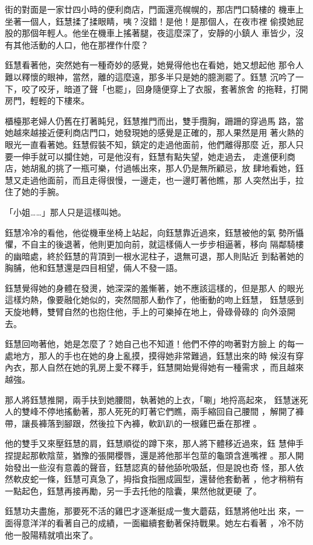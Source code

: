 街的對面是一家廿四小時的便利商店，門面還亮幌幌的，那店門口騎樓的
機車上坐著一個人，鈺慧揉了揉眼睛，咦？沒錯！是他！是那個人，在夜市裡
偷摸她屁股的那個年輕人。他坐在機車上搖著腿，夜這麼深了，安靜的小鎮人
車皆少，沒有其他活動的人口，他在那裡作什麼？

鈺慧看著他，突然她有一種奇妙的感覺，她覺得他也在看她，她又想起他
那令人難以釋懷的眼神，當然，離的這麼遠，那多半只是她的臆測罷了。鈺慧
沉吟了一下，咬了咬牙，暗道了聲「也罷」，回身隨便穿上了衣服，套著旅舍
的拖鞋，打開房門，輕輕的下樓來。

櫃檯那老婦人仍舊在打著盹兒，鈺慧推門而出，雙手攬胸，跚跚的穿過馬
路，當她越來越接近便利商店門口，她發現她的感覺是正確的，那人果然是用
著火熱的眼光一直看著她。鈺慧假裝不知，鎮定的走過他面前，他們離得那麼
近，那人只要一伸手就可以攔住她，可是他沒有，鈺慧有點失望，她走過去，
走進便利商店，她胡亂的挑了一瓶可樂，付過帳出來，那人仍是無所顧忌，放
肆地看她，鈺慧又走過他面前，而且走得很慢，一邊走，也一邊盯著他瞧，那
人突然出手，拉住了她的手腕。

「小姐……」那人只是這樣叫她。

鈺慧冷冷的看他，他從機車坐椅上站起，向鈺慧靠近過來，鈺慧被他的氣
勢所懾懼，不自主的後退著，他則更加向前，就這樣倆人一步步相逼著，移向
隔鄰騎樓的幽暗處，終於鈺慧的背頂到一根水泥柱子，退無可退，那人則貼近
到黏著她的胸脯，他和鈺慧還是四目相望，倆人不發一語。

鈺慧覺得她的身體在發燙，她深深的羞慚著，她不應該這樣的，但是那人
的眼光這樣灼熱，像要融化她似的，突然間那人動作了，他衝動的吻上鈺慧，
鈺慧感到天旋地轉，雙臂自然的也抱住他，手上的可樂掉在地上，骨碌骨碌的
向外滾開去。

鈺慧回吻著他，她是怎麼了？她自己也不知道！他們不停的吻著對方臉上
的每一處地方，那人的手也在她的身上亂摸，摸得她非常難過，鈺慧出來的時
候沒有穿內衣，那人自然在她的乳房上愛不釋手，鈺慧開始覺得她有一種需求
，而且越來越強。

那人將鈺慧推開，兩手扶到她腰間，執著她的上衣，「唰」地捋高起來，
鈺慧迷死人的雙峰不停地搖動著，那人死死的盯著它們瞧，兩手縮回自己腰間
，解開了褲帶，讓長褲落到腳跟，然後拉下內褲，軟趴趴的一根雞巴垂在那裡
。

他的雙手又來壓鈺慧的肩，鈺慧順從的蹲下來，那人將下體移近過來，鈺
慧伸手捏提起那軟陰莖，猶豫的張開櫻唇，還是將他那半包莖的龜頭含進嘴裡
。那人開始發出一些沒有意義的聲音，鈺慧認真的替他舔吮吸舐，但是說也奇
怪，那人依然軟皮蛇一條，鈺慧可真急了，拇指食指圈成圓型，還替他套動著
，他才稍稍有一點起色，鈺慧再接再勵，另一手去托他的陰囊，果然他就更硬
了。

鈺慧功夫盡施，那要死不活的雞巴才逐漸挺成一隻大蘑菇，鈺慧將他吐出
來，一面得意洋洋的看著自己的成績，一面繼續套動著保持戰果。她左右看著
，冷不防他一股陽精就噴出來了。

